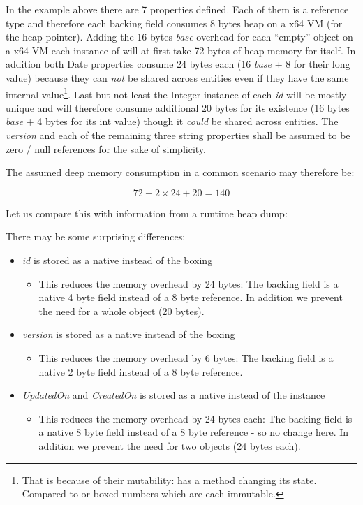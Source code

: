 In the example above there are 7 properties defined. Each of them is a reference type and therefore each backing field consumes 8 bytes heap on a x64 VM (for the heap pointer). Adding the 16 bytes \textit{base} overhead for each ``empty'' object on a x64 VM each instance of  will at first take 72 bytes of heap memory for itself. In addition both Date properties consume 24 bytes each (16 \textit{base} + 8 for their long value) because they can \emph{not} be shared across entities even if they have the same internal value\footnote{That is because of their mutability:  has a method  changing its state. Compared to  or boxed numbers which are each immutable.}. Last but not least the Integer instance of each \emph{id} will be mostly unique and will therefore consume additional 20 bytes for its existence (16 bytes \textit{base} + 4 bytes for its int value) though it \emph{could} be shared across entities. The \emph{version} and each of the remaining three string properties shall be assumed to be zero / null references for the sake of simplicity.\newline

The assumed deep memory consumption in a common scenario may therefore be:

\[72+2\times24+20=140\]

Let us compare this with information from a runtime heap dump:

\def\showimgref{img/visualvm-queryentity}

There may be some surprising differences:
\begin{itemize}
	\item \emph{id} is stored as a native  instead of the boxing 
		\begin{itemize}
			\item This reduces the memory overhead by 24 bytes: The backing field is a native 4 byte field instead of a 8 byte reference. In addition we prevent the need for a whole  object (20 bytes).
		\end{itemize}
	\item \emph{version} is stored as a native  instead of the boxing 
		\begin{itemize}
			\item This reduces the memory overhead by 6 bytes: The backing field is a native 2 byte field instead of a 8 byte reference.
		\end{itemize}
	\item \emph{UpdatedOn} and \emph{CreatedOn} is stored as a native  instead of the  instance
		\begin{itemize}
			\item This reduces the memory overhead by 24 bytes each: The backing field is a native 8 byte field instead of a 8 byte reference - so no change here. In addition we prevent the need for two  objects (24 bytes each).
		\end{itemize}
\end{itemize}

